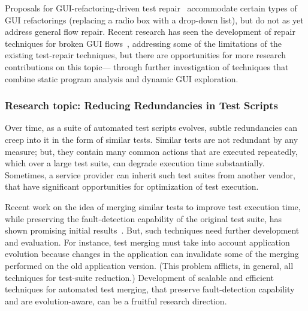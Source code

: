 
Proposals for GUI-refactoring-driven test repair~\cite{Daniel2011} accommodate
certain types of GUI refactorings (\eg replacing a radio box with a drop-down
list), but do not as yet address general flow repair.  Recent research has seen
the development of repair techniques for broken GUI flows~\cite{Zhang2013},
addressing some of the limitations of the existing test-repair techniques, but
there are opportunities for more research contributions on this topic---\eg
through further investigation of techniques that combine static program analysis
and dynamic GUI exploration.

\subsubsection*{Research topic: Reducing Redundancies in Test Scripts}

Over time, as a suite of automated test scripts evolves, subtle redundancies can
creep into it in the form of similar tests. Similar tests are not redundant by
any measure; but, they contain many common actions that are executed repeatedly,
which over a large test suite, can degrade execution time substantially.
Sometimes, a service provider can inherit such test suites from another vendor,
that have significant opportunities for optimization of test execution.

Recent work on the idea of merging similar tests to improve test execution time,
while preserving the fault-detection capability of the original test suite, has
shown promising initial results~\cite{Devaki:2013}. But, such techniques need
further development and evaluation. For instance, test merging must take into
account application evolution because changes in the application can invalidate
some of the merging performed on the old application version. (This problem
afflicts, in general, all techniques for test-suite reduction.)  Development of
scalable and efficient techniques for automated test merging, that preserve
fault-detection capability and are evolution-aware, can be a fruitful research
direction.


